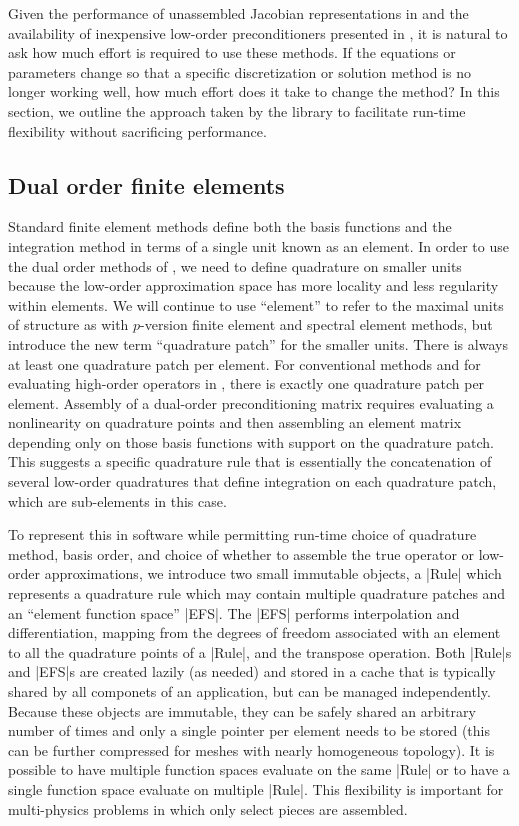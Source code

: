 Given the performance of unassembled Jacobian representations in  and the availability of inexpensive low-order preconditioners presented in , it is natural to ask how much effort is required to use these methods.
If the equations or parameters change so that a specific discretization or solution method is no longer working well, how much effort does it take to change the method?
In this section, we outline the approach taken by the {\Dohp} library to facilitate run-time flexibility without sacrificing performance.

\subsection{Dual order finite elements}
Standard finite element methods define both the basis functions and the integration method in terms of a single unit known as an element.
In order to use the dual order methods of , we need to define quadrature on smaller units because the low-order approximation space has more locality and less regularity within elements.
We will continue to use ``element'' to refer to the maximal units of structure as with $p$-version finite element and spectral element methods, but introduce the new term ``quadrature patch'' for the smaller units.
There is always at least one quadrature patch per element.
For conventional methods and for evaluating high-order operators in \Dohp, there is exactly one quadrature patch per element.
Assembly of a dual-order preconditioning matrix requires evaluating a nonlinearity on quadrature points and then assembling an element matrix depending only on those basis functions with support on the quadrature patch.
This suggests a specific quadrature rule that is essentially the concatenation of several low-order quadratures that define integration on each quadrature patch, which are sub-elements in this case.

To represent this in software while permitting run-time choice of quadrature method, basis order, and choice of whether to assemble the true operator or low-order approximations, we introduce two small immutable objects, a \cverb|Rule| which represents a quadrature rule which may contain multiple quadrature patches and an ``element function space'' \cverb|EFS|.
The \cverb|EFS| performs interpolation and differentiation, mapping from the degrees of freedom associated with an element to all the quadrature points of a \cverb|Rule|, and the transpose operation.
Both \cverb|Rule|s and \cverb|EFS|s are created lazily (as needed) and stored in a cache that is typically shared by all componets of an application, but can be managed independently.
Because these objects are immutable, they can be safely shared an arbitrary number of times and only a single pointer per element needs to be stored (this can be further compressed for meshes with nearly homogeneous topology).
It is possible to have multiple function spaces evaluate on the same \cverb|Rule| or to have a single function space evaluate on multiple \cverb|Rule|.
This flexibility is important for multi-physics problems in which only select pieces are assembled.

